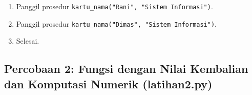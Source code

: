 \documentclass[12pt,a4paper]{article}
\begin{document}
\begin{enumerate}
\begin{enumerate}[label=\alph*.]
\begin{itemize}
            \item Cetak label dan nilai parameter: \texttt{"Nama  :", nama}.
            \item Cetak label dan nilai parameter: \texttt{"Prodi :", prodi}.
            \item Panggil kembali \texttt{cetak\_garis(30)}.
        \end{itemize}
        \item Panggil prosedur \texttt{kartu\_nama("Rani", "Sistem Informasi")}.
        \item Panggil prosedur \texttt{kartu\_nama("Dimas", "Sistem Informasi")}.
        \item Selesai.
    \end{enumerate}
\end{enumerate}

\subsection{Percobaan 2: Fungsi dengan Nilai Kembalian dan Komputasi Numerik (latihan2.py)}
\end{document}
